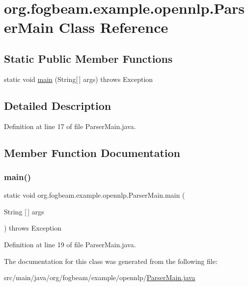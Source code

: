 \hypertarget{classorg_1_1fogbeam_1_1example_1_1opennlp_1_1_parser_main}{}\section{org.\+fogbeam.\+example.\+opennlp.\+Parser\+Main Class Reference}
\label{classorg_1_1fogbeam_1_1example_1_1opennlp_1_1_parser_main}
\subsection*{Static Public Member Functions}
\begin{DoxyCompactItemize}
\item 
static void \hyperlink{classorg_1_1fogbeam_1_1example_1_1opennlp_1_1_parser_main_a48bc5bcb185febfd50c3a9c1301e689e}{main} (String\mbox{[}$\,$\mbox{]} args)  throws Exception 	
\end{DoxyCompactItemize}


\subsection{Detailed Description}


Definition at line 17 of file Parser\+Main.\+java.



\subsection{Member Function Documentation}
\hypertarget{classorg_1_1fogbeam_1_1example_1_1opennlp_1_1_parser_main_a48bc5bcb185febfd50c3a9c1301e689e}{}\label{classorg_1_1fogbeam_1_1example_1_1opennlp_1_1_parser_main_a48bc5bcb185febfd50c3a9c1301e689e} 
\subsubsection{\texorpdfstring{main()}{main()}}
{\footnotesize\ttfamily static void org.\+fogbeam.\+example.\+opennlp.\+Parser\+Main.\+main (\begin{DoxyParamCaption}\item[{String \mbox{[}$\,$\mbox{]}}]{args }\end{DoxyParamCaption}) throws Exception\hspace{0.3cm}{\ttfamily [static]}}



Definition at line 19 of file Parser\+Main.\+java.



The documentation for this class was generated from the following file\+:\begin{DoxyCompactItemize}
\item 
src/main/java/org/fogbeam/example/opennlp/\hyperlink{_parser_main_8java}{Parser\+Main.\+java}\end{DoxyCompactItemize}
